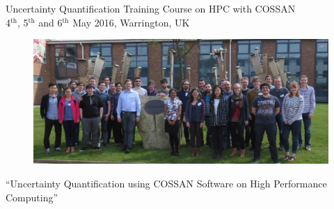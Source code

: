 \documentclass[11pt]{article}%
\begin{document}
\cleardoublepage


\thispagestyle{Training}

\begin{minipage}[t]{0.99\textwidth}
\hypertarget{Training}{}
\end{minipage}

{\LARGE Uncertainty Quantification Training Course on HPC with COSSAN}\\
{\large 4$^{\text{th}}$, 5$^{\text{th}}$ and 6$^{\text{th}}$ May 2016, Warrington, UK}


\begin{figure}[H]
\includegraphics[width=0.95\linewidth]{training/groupPicture_lr.jpg}
\end{figure}

\begin{center}
{\Large \color{blue} ``Uncertainty Quantification using COSSAN Software on High Performance Computing''}
\end{center}
\end{document}
